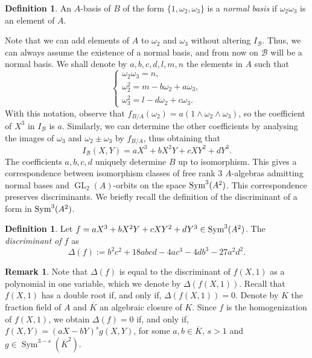 \documentclass[oneside]{amsart}
\newcommand{\syma}{\textnormal{Sym}^3(A^2)}
\DeclareMathOperator{\gl}{GL}
\DeclareMathOperator{\sym}{Sym}
\theoremstyle{definition}
\newtheorem{definition}[X]{Definition}
\newtheorem{remark}[X]{Remark}
\begin{document}
\begin{definition}{\cite[p.104]{Delone2009TheTO}}
    An $A$-basis of $B$ of the form $\{1, \omega_2, \omega_3\}$ is a \textit{normal basis} if $\omega_2\omega_3$ is an element of $A$.
\end{definition}
Note that we can add elements of $A$ to $\omega_2$ and $\omega_3$ without altering $I_{\mathcal{B}}$. Thus, we can always assume the existence of a normal basis, and from now on $\mathcal{B}$ will be a normal basis. We shall denote by $a, b,c,d,l,m,n$ the elements in $A$ such that 
$$
\begin{cases}
    \omega_2\omega_3 = n,\\
    \omega_2^2 = m - b\omega_2 + a\omega_3,\\
    \omega_3^2 = l - d\omega_2 + c\omega_3.
\end{cases}
$$
With this notation, observe that $f_{B/A}(\omega_2) = a(1\wedge\omega_2\wedge\omega_3)$, so the coefficient of $X^3$ in $I_{\mathcal{B}}$ is $a$. Similarly, we can determine the other coefficients by analysing the images of $\omega_3$ and $\omega_2\pm\omega_3$ by $f_{B/A}$, thus obtaining that
\begin{equation}
    I_{\mathcal{B}}(X,Y) = aX^3 + bX^2Y + cXY^2 + dY^3.
\end{equation}
The coefficients $a,b,c,d$ uniquely determine $B$ up to isomorphism. This gives a correspondence between isomorphism classes of free rank 3 $A$-algebras admitting normal bases and $\gl_2(A)$-orbits on the space $\syma$. This correspondence preserves discriminants. We briefly recall the definition of  the discriminant of a form in $\syma$.

\begin{definition}
    Let $f = aX^3 + bX^2Y + cXY^2 + dY^3 \in \syma$.  The \textit{discriminant of $f$} as 
    $$
    \Delta(f) := b^2c^2 + 18abcd - 4ac^3 - 4db^3 - 27a^2d^2.
    $$
\end{definition}
\begin{remark}
    Note that $\Delta(f)$ is equal to the discriminant of $f(X,1)$ as a polynomial in one variable, which we denote by $\Delta(f(X,1))$. Recall that $f(X,1)$ has a double root if, and only if, $\Delta(f(X,1)) = 0$. Denote by $K$ the fraction field of $A$ and $\overline{K}$ an algebraic closure of $K$. Since $f$ is the homogenization of $f(X,1)$, we obtain $\Delta(f) = 0$ if, and only if, $f(X,Y) = (aX - bY)^sg(X,Y)$, for some $a, b\in \overline{K}$, $s > 1$ and $g \in \sym^{3 - s}(\overline{K}^2)$.
\end{remark}
\end{document}
